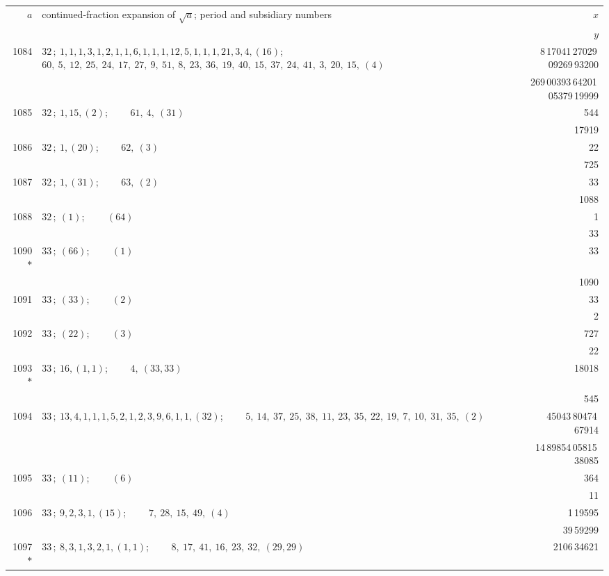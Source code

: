 \documentclass[11pt]{article}
\providecommand{\asterism}{*}
\begin{document}
\renewcommand{\arraystretch}{1.15}
\begin{longtable}{|r|p{}|r|}
\hline
$a$ & continued-fraction expansion of $\sqrt{a}$; period and subsidiary numbers & $x$ \\
 & & $y$ \\
\hline
\endhead
1084 & $32\,;\ 1, 1, 1, 3, 1, 2, 1, 1, 6, 1, 1, 1, 12, 5, 1, 1, 1, 21, 3, 4, (16)$; \ \ \ \ $60,\ 5,\ 12,\ 25,\ 24,\ 17,\ 27,\ 9,\ 51,\ 8,\ 23,\ 36,\ 19,\ 40,\ 15,\ 37,\ 24,\ 41,\ 3,\ 20,\ 15,\ (4)$ & 8\,17041\,27029\,09269\,93200 \\
 & & 269\,00393\,64201\,05379\,19999 \\
\hline
1085 & $32\,;\ 1, 15, (2)$; \ \ \ \ $61,\ 4,\ (31)$ & 544 \\
 & & 17919 \\
\hline
1086 & $32\,;\ 1, (20)$; \ \ \ \ $62,\ (3)$ & 22 \\
 & & 725 \\
\hline
1087 & $32\,;\ 1, (31)$; \ \ \ \ $63,\ (2)$ & 33 \\
 & & 1088 \\
\hline
1088 & $32\,;\ (1)$; \ \ \ \ $(64)$ & 1 \\
 & & 33 \\
\hline
1090$\asterism$ & $33\,;\ (66)$; \ \ \ \ $(1)$ & 33 \\
 & & 1090 \\
\hline
1091 & $33\,;\ (33)$; \ \ \ \ $(2)$ & 33 \\
 & & 2 \\
\hline
1092 & $33\,;\ (22)$; \ \ \ \ $(3)$ & 727 \\
 & & 22 \\
\hline
1093$\asterism$ & $33\,;\ 16, (1, 1)$; \ \ \ \ $4,\ (33, 33)$ & 18018 \\
 & & 545 \\
\hline
1094 & $33\,;\ 13, 4, 1, 1, 1, 5, 2, 1, 2, 3, 9, 6, 1, 1, (32)$; \ \ \ \ $5,\ 14,\ 37,\ 25,\ 38,\ 11,\ 23,\ 35,\ 22,\ 19,\ 7,\ 10,\ 31,\ 35,\ (2)$ & 45043\,80474\,67914 \\
 & & 14\,89854\,05815\,38085 \\
\hline
1095 & $33\,;\ (11)$; \ \ \ \ $(6)$ & 364 \\
 & & 11 \\
\hline
1096 & $33\,;\ 9, 2, 3, 1, (15)$; \ \ \ \ $7,\ 28,\ 15,\ 49,\ (4)$ & 1\,19595 \\
 & & 39\,59299 \\
\hline
1097$\asterism$ & $33\,;\ 8, 3, 1, 3, 2, 1, (1, 1)$; \ \ \ \ $8,\ 17,\ 41,\ 16,\ 23,\ 32,\ (29, 29)$ & 2106\,34621 \\

\end{longtable}
\end{document}
